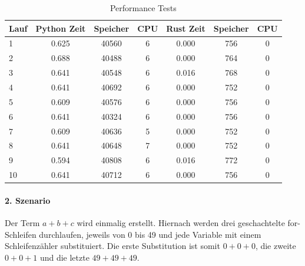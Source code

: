 \documentclass[11pt,a4paper, ngerman]{article}
\begin{document}
\begin{table}[h!]
    \caption{Performance Tests}
    \centering
    \begin{tabular}{|l|c|c|c|c|c|c|}
        \hline
        \textbf{Lauf} & \textbf{Python Zeit} & \textbf{Speicher} & \textbf{CPU} & \textbf{Rust Zeit} & \textbf{Speicher} & \textbf{CPU} \\
        \hline
        1 & 0.625 & 40560 & 6 & 0.000 & 756 & 0 \\
        \hline
        2 & 0.688 & 40488 & 6 & 0.000 & 764 & 0 \\
        \hline
        3 & 0.641 & 40548 & 6 & 0.016 & 768 & 0 \\
        \hline
        4 & 0.641 & 40692 & 6 & 0.000 & 752 & 0 \\
        \hline
        5 & 0.609 & 40576 & 6 & 0.000 & 756 & 0 \\
        \hline
        6 & 0.641 & 40324 & 6 & 0.000 & 756 & 0 \\
        \hline
        7 & 0.609 & 40636 & 5 & 0.000 & 752 & 0 \\
        \hline
        8 & 0.641 & 40648 & 7 & 0.000 & 752 & 0 \\
        \hline
        9 & 0.594 & 40808 & 6 & 0.016 & 772 & 0 \\
        \hline
        10 & 0.641 & 40712 & 6 & 0.000 & 756 & 0 \\
        \hline
    \end{tabular}
\end{table}

\paragraph{2. Szenario} Der Term $a+b+c$ wird einmalig erstellt. Hiernach werden drei geschachtelte for-Schleifen durchlaufen, jeweils von 0 bis 49 und jede Variable mit einem Schleifenzähler substituiert. Die erste Substitution ist somit $0+0+0$, die zweite $0+0+1$ und die letzte $49+49+49$.
\end{document}
